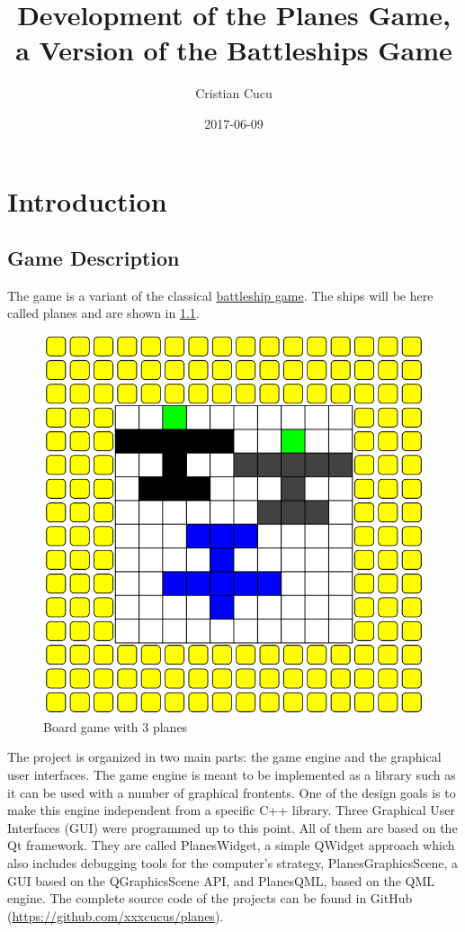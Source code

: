\documentclass{report}
\title{Development of the Planes Game, a Version of the Battleships Game}
\date{2017-06-09}
\author{Cristian Cucu}
\begin{document}
\maketitle
\newpage
\lstset{language=C++}
\tableofcontents{}

\chapter{Introduction}

\section{Game Description}
The game is a variant of the classical \href{https://en.wikipedia.org/wiki/Battleship_(game)}{battleship game}. The ships will be here called planes and are shown in \ref{fig:board}.
\begin{figure}[h]
  \includegraphics[width = \textwidth]{BoardWithPlanes.png}
  \caption{Board game with 3 planes}
  \label{fig:board}
\end{figure}
The project is organized in two main parts: the game engine and the graphical user interfaces. The game engine is meant to be implemented as a library such as it can be used with a number of graphical frontents. One of the design goals is to make this engine independent from a specific C++ library. Three Graphical User Interfaces (GUI) were programmed up to this point. All of them are based on the Qt framework. They are called PlanesWidget, a simple QWidget approach which also includes debugging tools for the computer's strategy, PlanesGraphicsScene, a GUI based on the QGraphicsScene API, and PlanesQML, based on the QML engine. The complete source code of the projects can be found in GitHub (\url{https://github.com/xxxcucus/planes}).
\end{document}
